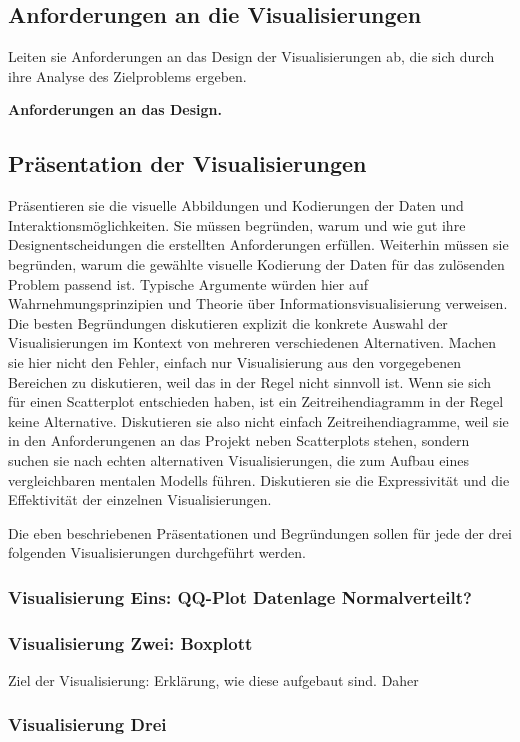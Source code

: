 \documentclass[usegeometry=true]{scrartcl}
\begin{document}
\subsection{Anforderungen an die Visualisierungen}
Leiten sie Anforderungen an das Design der Visualisierungen ab, die sich durch ihre Analyse des Zielproblems ergeben.

\textbf{ Anforderungen an das Design. }
\subsection{Präsentation der Visualisierungen}
Präsentieren sie die visuelle Abbildungen und Kodierungen der Daten und Interaktionsmöglichkeiten. 
Sie müssen  begründen, warum und wie gut ihre Designentscheidungen die erstellten Anforderungen erfüllen. 
Weiterhin müssen sie begründen, warum die gewählte visuelle Kodierung der Daten für das zulösenden Problem passend ist.
Typische Argumente würden hier auf Wahrnehmungsprinzipien und Theorie über Informationsvisualisierung verweisen. 
Die besten Begründungen diskutieren explizit die konkrete Auswahl der Visualisierungen im Kontext von mehreren verschiedenen Alternativen. 
Machen sie hier nicht den Fehler, einfach nur Visualisierung aus den vorgegebenen Bereichen zu diskutieren, weil das in der Regel nicht sinnvoll ist.
Wenn sie sich für einen Scatterplot entschieden haben, ist ein Zeitreihendiagramm in der Regel keine Alternative.
Diskutieren sie also nicht einfach Zeitreihendiagramme, weil sie in den Anforderungenen an das Projekt neben Scatterplots stehen, sondern suchen sie nach echten alternativen Visualisierungen, die zum Aufbau eines vergleichbaren mentalen Modells führen. 
Diskutieren sie die Expressivität und die Effektivität der einzelnen Visualisierungen. 

Die eben beschriebenen Präsentationen und Begründungen sollen für jede der drei folgenden Visualisierungen durchgeführt werden. 
\subsubsection{Visualisierung Eins: QQ-Plot Datenlage Normalverteilt?}

\subsubsection{Visualisierung Zwei: Boxplott}
Ziel der Visualisierung: 
Erklärung, wie diese aufgebaut sind. Daher 
\subsubsection{Visualisierung Drei}
\end{document}
